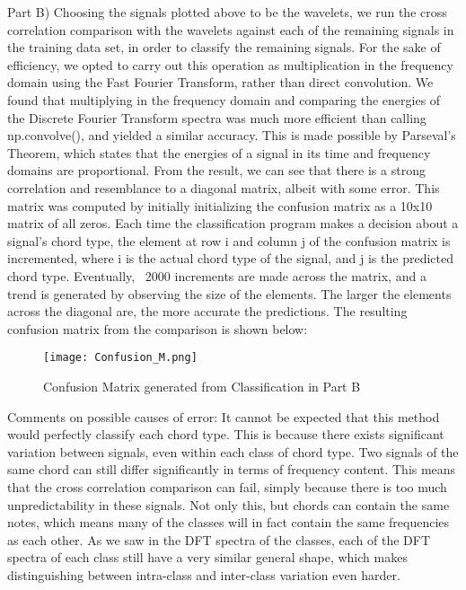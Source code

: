 \documentclass[letterpaper,twocolumn,10pt]{article}
\begin{document}
Part B)\hspace*{\fill}
\vspace{3mm}
\linebreak
Choosing the signals plotted above to be the wavelets, we run the cross correlation comparison with the wavelets against each of the remaining signals in the training data set, in order to classify the remaining signals.\hspace*{\fill}
\vspace{3mm}
\linebreak
For the sake of efficiency, we opted to carry out this operation as multiplication in the frequency domain using the Fast Fourier Transform, rather than direct convolution. We found that multiplying in the frequency domain and comparing the energies of the Discrete Fourier Transform spectra was much more efficient than calling np.convolve(), and yielded a similar accuracy. This is made possible by Parseval's Theorem, which states that the energies of a signal in its time and frequency domains are proportional.\hspace*{\fill}
\vspace{3mm}
\linebreak
From the result, we can see that there is a strong correlation and resemblance to a diagonal matrix, albeit with some error. This matrix was computed by initially initializing the confusion matrix as a 10x10 matrix of all zeros. Each time the classification program makes a decision about a signal's chord type, the element at row i and column j of the confusion matrix is incremented, where i is the actual chord type of the signal, and j is the predicted chord type. Eventually, ~2000 increments are made across the matrix, and a trend is generated by observing  the size of the elements. The larger the elements across the diagonal are, the more accurate the predictions.\hspace*{\fill}
\vspace{3mm}
\linebreak
The resulting confusion matrix from the comparison is shown below: \hspace*{\fill}
\vspace{12mm}
\linebreak
\begin{figure}[t]
\centering
\texttt{[image: Confusion\_M.png]}
\caption{Confusion Matrix generated from Classification in Part B\label{fig:Confusion_M}}
\end{figure}
Comments on possible causes of error: It cannot be expected that this method would perfectly classify each chord type. This is because there exists significant variation between signals, even within each class of chord type. Two signals of the same chord can still differ significantly in terms of frequency content. This means that the cross correlation comparison can fail, simply because there is too much unpredictability in these signals. Not only this, but chords can contain the same notes, which means many of the classes will in fact contain the same frequencies as each other. As we saw in the DFT spectra of the classes, each of the DFT spectra of each class still have a very similar general shape, which makes distinguishing between intra-class and inter-class variation even harder. \hspace*{\fill}
\end{document}
